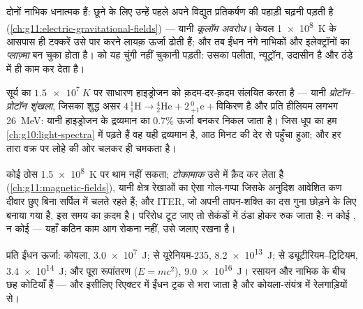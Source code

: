 \begin{definition}[कूलॉम अवरोध]\label{def:g12:nuclear-energy:barrier}
दोनों नाभिक धनात्मक हैं: छूने के लिए उन्हें पहले अपने विद्युत प्रतिकर्षण की
पहाड़ी चढ़नी पड़ती है (\cref{ch:g11:electric-gravitational-fields}) --- यानी \emph{कूलॉम अवरोध}।
केवल \qty{1e8}{K} के आसपास ही टक्करें उसे पार करने लायक़ ऊर्जा ढोती हैं;
और तब ईंधन नंगे नाभिकों और इलेक्ट्रॉनों का \emph{प्लाज़्मा}
बन चुका होता है।  को यह चुंगी नहीं चुकानी पड़ती: उसका पलीता,
न्यूट्रॉन, उदासीन है और ठंडे में ही काम कर देता है।
\end{definition}

\begin{example}[सूर्य इसी पर चलता है]\label{ex:g12:nuclear-energy:sun}
सूर्य का  $\qty{1.5e7}{K}$ पर साधारण हाइड्रोजन को क़दम-दर-क़दम संलयित
करता है --- यानी \emph{प्रोटॉन--प्रोटॉन शृंखला}, जिसका शुद्ध असर $4\,{}^{1}_{1}\mathrm{H} \to {}^{4}_{2}\mathrm{He} + 2\,{}^{0}_{+1}\mathrm{e}
+ \text{विकिरण}$ है और
प्रति हीलियम लगभग \qty{26}{MeV}: यानी हाइड्रोजन के द्रव्यमान का $0.7\%$
ऊर्जा बनकर निकल जाता है। जिस धूप का  हम \cref{ch:g10:light-spectra} में
पढ़ते हैं वह यही द्रव्यमान है, आठ मिनट की देर से पहुँचा हुआ; और हर तारा वक्र पर
लोहे की ओर चलकर ही चमकता है।
\end{example}

\begin{remark}\label{rem:g12:nuclear-energy:iter}
कोई ठोस \qty{1.5e8}{K} पर  थाम नहीं सकता; \emph{टोकामाक} उसे
 में क़ैद कर लेता है (\cref{ch:g11:magnetic-fields}), यानी क्षेत्र
रेखाओं का ऐसा गोल-गप्पा जिसके अनुदिश आवेशित कण दीवार छुए बिना सर्पिल में चलते
रहते हैं; और ITER, जो अपनी तापन-शक्ति का दस गुना छोड़ने के लिए बनाया
गया है, इस समय का क़दम है। परिरोध टूट जाए तो  सेकंडों में ठंडा
होकर रुक जाता है: न कोई , न कोई  --- यहाँ कठिन काम आग रोकना नहीं, उसे जलाए रखना है।
\end{remark}

\begin{example}[ऊर्जा की सीढ़ी, प्रति किलोग्राम]\label{ex:g12:nuclear-energy:ladder}
प्रति  ईंधन ऊर्जा: कोयला, \qty{3.0e7}{J}; 
से यूरेनियम-235, \qty{8.2e13}{J};  से ड्यूटीरियम--ट्रिटियम, \qty{3.4e14}{J}; और
पूरा रूपांतरण ($E = mc^2$), \qty{9.0e16}{J}। रसायन और नाभिक के बीच छह कोटियाँ हैं
--- और इसीलिए रिएक्टर में ईंधन ट्रक से भरा जाता है और कोयला-संयंत्र में
रेलगाड़ियों से।
\end{example}

